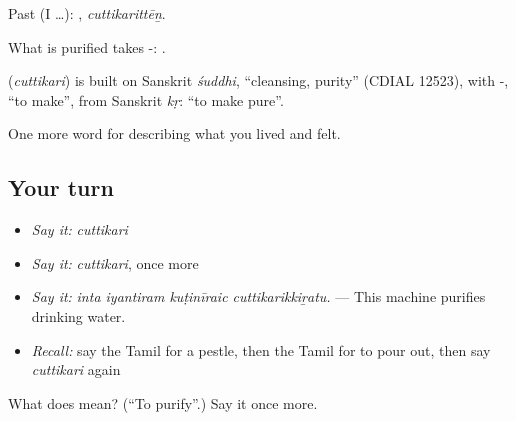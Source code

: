 Past (I …): , \emph{cuttikarittēṉ}.

What is purified takes -:  .

\begin{cousinweb}
\textbf{} (\emph{cuttikari}) is built on Sanskrit \emph{śuddhi}, \textquotedblleft{}cleansing, purity\textquotedblright{} (CDIAL 12523), with -, \textquotedblleft{}to make\textquotedblright{}, from Sanskrit \emph{kṛ}: \textquotedblleft{}to make pure\textquotedblright{}.
\end{cousinweb}

\begin{grammarlens}[title={What you've built}]
One more word for describing what you lived and felt.
\end{grammarlens}

\subsection*{Your turn}
\begin{itemize}
\raggedright
  \item \emph{Say it:} \emph{cuttikari}
  \item \emph{Say it:} \emph{cuttikari}, once more
  \item \emph{Say it:} \emph{inta iyantiram kuṭinīraic cuttikarikkiṟatu.} — This machine purifies drinking water.
  \item \emph{Recall:} say the Tamil for a pestle, then the Tamil for to pour out, then say \emph{cuttikari} again
\end{itemize}

\begin{tcolorbox}[breakable,colback=teal!4,colframe=teal!35!black,title={Before you move on}]
What does  mean? (\textquotedblleft{}To purify\textquotedblright{}.) Say it once more.
\end{tcolorbox}

